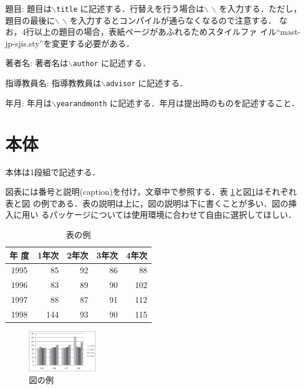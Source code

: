 \documentclass[a4paper,11pt]{ujreport}
\begin{document}
\begin{description} \parskip=1pt
\item{題目: }
題目は{\tt $\backslash$title} に記述する．行替えを行う場合は$\backslash$
	   $\backslash$ を入力する．ただし，題目の最後に$\backslash$
	   $\backslash$ を入力するとコンパイルが通らなくなるので注意する．
	   なお，4行以上の題目の場合，表紙ページがあふれるためスタイルファ
	   イル``mast-jp-sjis.sty''を変更する必要がある．
\item{著者名: }
著者名は{\tt $\backslash$author} に記述する．
\item{指導教員名: }
指導教教員は{\tt $\backslash$advisor} に記述する．
\item{年月: }
年月は{\tt $\backslash$yearandmonth} に記述する．年月は提出時のものを記述すること．
\end{description}

\section{本体}

本体は1段組で記述する．

図表には番号と説明(caption)を付け，文章中で参照する．表
\ref{table:fundamental_data_type}と図\ref{figure:sample}はそれぞれ表と図
の例である．表の説明は上に，図の説明は下に書くことが多い．図の挿入に用い
るパッケージについては使用環境に合わせて自由に選択してほしい．

\begin{table}[hbt]
\caption{表の例}
\label{table:fundamental_data_type}
\begin{center}
\begin{tabular}{| c | r | r | r | r |}
\hline
年 度 & 1年次 & 2年次 & 3年次 & 4年次 \\
\hline
1995 & 85 & 92 & 86 & 88 \\
1996 & 83 & 89 & 90 & 102 \\
1997 & 88 & 87 & 91 & 112 \\
1998 & 144 & 93 & 90 & 115 \\
\hline
\end{tabular}
\end{center}
\end{table}
\medskip

\begin{figure}[htbp]
\begin{center}
\includegraphics[width=3cm]{sample.eps}
\end{center}
\caption{図の例}
\label{figure:sample}
\end{figure}
\end{document}

